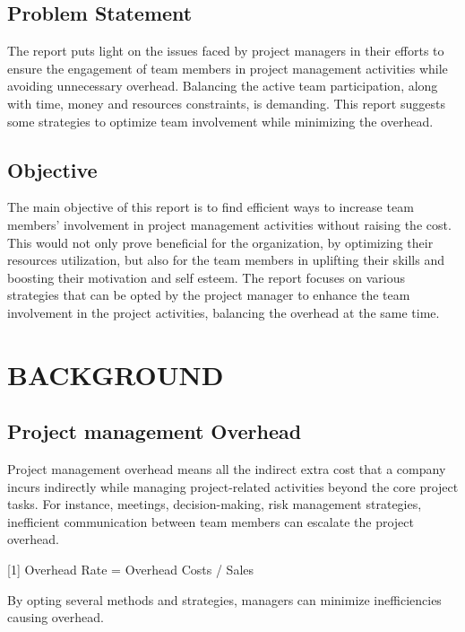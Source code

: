\documentclass[a4paper,12pt]{article}
\begin{document}
\subsection{Problem Statement}
The report puts light on the issues faced by project managers in their efforts to ensure the engagement of team members in project management activities while avoiding unnecessary overhead. Balancing the active team participation,  along with time, money and resources constraints, is demanding. This report suggests some strategies to optimize team involvement while minimizing the overhead.
  


\subsection{Objective}
The main objective of this report is to find efficient ways to increase team members' involvement in project management activities without raising the cost. This would not only prove beneficial for the organization, by optimizing their resources utilization, but also for the team members in uplifting their skills and boosting their motivation and self esteem. The report focuses on various strategies that can be opted by the project manager to enhance the team involvement in the project activities, balancing the overhead at the same time.




\newpage
\section{BACKGROUND}


\subsection{Project management Overhead}
Project management overhead means all the indirect extra cost that a company incurs indirectly while managing project-related activities beyond the core project tasks. For instance, meetings, decision-making, risk management strategies, inefficient communication between team members can escalate the project overhead. 

\vspace{1.0cm}

[1] Overhead Rate = Overhead Costs / Sales
\vspace{1.0cm}


By opting several methods and strategies, managers can minimize inefficiencies causing overhead.
\end{document}
